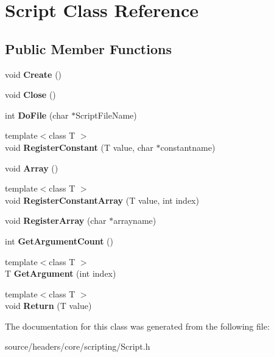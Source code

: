 \hypertarget{classScript}{}\section{Script Class Reference}
\label{classScript}
\subsection*{Public Member Functions}
\begin{DoxyCompactItemize}
\item 
\mbox{\label{classScript_a9c8090312ea4acbddfec95e9323d69ae}} 
void {\bfseries Create} ()
\item 
\mbox{\label{classScript_adc69a6dbddcf7058a128543144fc7ad0}} 
void {\bfseries Close} ()
\item 
\mbox{\label{classScript_aea11d7a20a0f6d7c50f8e8bba5cbb5b2}} 
int {\bfseries Do\+File} (char $\ast$Script\+File\+Name)
\item 
\mbox{\label{classScript_a05b942202ecd4c533f7f34f5526511b5}} 
{\footnotesize template$<$class T $>$ }\\void {\bfseries Register\+Constant} (T value, char $\ast$constantname)
\item 
\mbox{\label{classScript_aff5f98380361dce2ff1fc4d0c94bbea5}} 
void {\bfseries Array} ()
\item 
\mbox{\label{classScript_aa56a3e963022baea3fba6a1123db3a3f}} 
{\footnotesize template$<$class T $>$ }\\void {\bfseries Register\+Constant\+Array} (T value, int index)
\item 
\mbox{\label{classScript_aa67d9020888f0f8524c752028f6c837b}} 
void {\bfseries Register\+Array} (char $\ast$arrayname)
\item 
\mbox{\label{classScript_a9ffd16ca46645dc608e87dac582f63c8}} 
int {\bfseries Get\+Argument\+Count} ()
\item 
\mbox{\label{classScript_a19ecdfbddb5fb5d0df5d38a66aa64bfd}} 
{\footnotesize template$<$class T $>$ }\\T {\bfseries Get\+Argument} (int index)
\item 
\mbox{\label{classScript_a87abf72ddefb0849eb55536d7d901576}} 
{\footnotesize template$<$class T $>$ }\\void {\bfseries Return} (T value)
\end{DoxyCompactItemize}


The documentation for this class was generated from the following file\+:\begin{DoxyCompactItemize}
\item 
source/headers/core/scripting/Script.\+h\end{DoxyCompactItemize}

